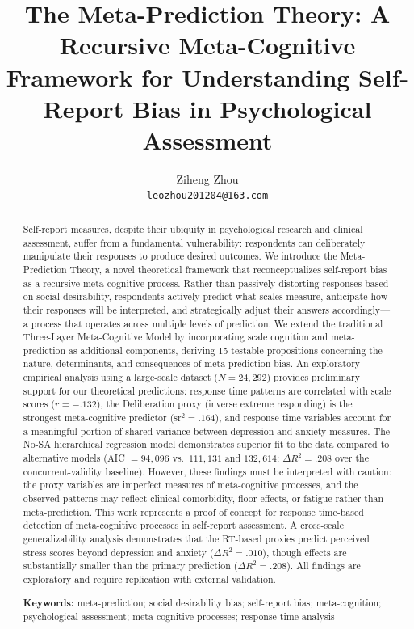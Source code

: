 \documentclass[10pt,twocolumn]{article}
\title{The Meta-Prediction Theory: A Recursive Meta-Cognitive Framework for Understanding Self-Report Bias in Psychological Assessment}
\author{Ziheng Zhou\\\texttt{leozhou201204@163.com}}
\date{}
\begin{document}
\maketitle

\begin{abstract}
\noindent Self-report measures, despite their ubiquity in psychological research and clinical assessment, suffer from a fundamental vulnerability: respondents can deliberately manipulate their responses to produce desired outcomes. We introduce the Meta-Prediction Theory, a novel theoretical framework that reconceptualizes self-report bias as a recursive meta-cognitive process. Rather than passively distorting responses based on social desirability, respondents actively predict what scales measure, anticipate how their responses will be interpreted, and strategically adjust their answers accordingly---a process that operates across multiple levels of prediction. We extend the traditional Three-Layer Meta-Cognitive Model by incorporating scale cognition and meta-prediction as additional components, deriving 15 testable propositions concerning the nature, determinants, and consequences of meta-prediction bias. An exploratory empirical analysis using a large-scale dataset ($N = 24{,}292$) provides preliminary support for our theoretical predictions: response time patterns are correlated with scale scores ($r = -.132$), the Deliberation proxy (inverse extreme responding) is the strongest meta-cognitive predictor (sr$^2 = .164$), and response time variables account for a meaningful portion of shared variance between depression and anxiety measures. The No-SA hierarchical regression model demonstrates superior fit to the data compared to alternative models (AIC $= 94{,}096$ vs.\ $111{,}131$ and $132{,}614$; $\Delta R^2 = .208$ over the concurrent-validity baseline). However, these findings must be interpreted with caution: the proxy variables are imperfect measures of meta-cognitive processes, and the observed patterns may reflect clinical comorbidity, floor effects, or fatigue rather than meta-prediction. This work represents a proof of concept for response time-based detection of meta-cognitive processes in self-report assessment. A cross-scale generalizability analysis demonstrates that the RT-based proxies predict perceived stress scores beyond depression and anxiety ($\Delta R^2 = .010$), though effects are substantially smaller than the primary prediction ($\Delta R^2 = .208$). All findings are exploratory and require replication with external validation.

\medskip
\noindent\textbf{Keywords:} meta-prediction; social desirability bias; self-report bias; meta-cognition; psychological assessment; meta-cognitive processes; response time analysis
\end{abstract}
\end{document}
